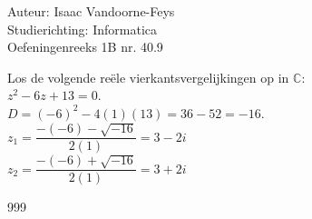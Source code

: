\documentclass[a4paper]{article}
\begin{document}
  
\noindent \large Auteur: Isaac Vandoorne-Feys \\
\noindent \large Studierichting: Informatica\\
\noindent \large Oefeningenreeks 1B nr. 40.9\\

\medskip

\normalsize
	Los de volgende reële vierkantsvergelijkingen op in $\mathbb{C}$:\\
	
	$z^2 - 6z + 13 = 0$. \\
    
    $D = (-6)^2 - 4(1)(13) = 36 - 52 = -16$. \\
	
	$z_1 = \dfrac{-(-6)-\sqrt{-16}}{2(1)}=3-2i$ \\
	
	$z_2=\dfrac{-(-6)+\sqrt{-16}}{2(1)}=3 + 2i$ \\
	
\begin{thebibliography}{999}
\end{thebibliography}
\end{document}
